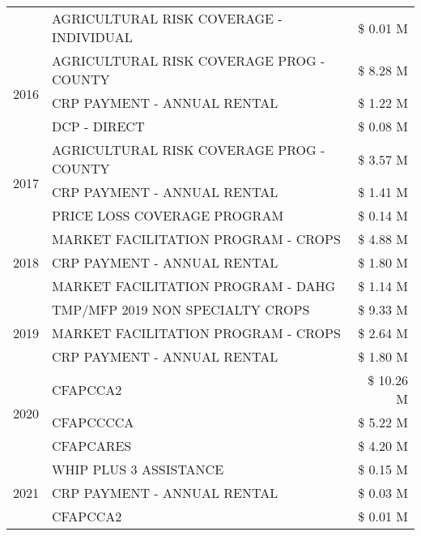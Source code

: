 \begin{tabular}{llr}
 & AGRICULTURAL RISK COVERAGE - INDIVIDUAL & \$ 0.01 M \\
\cline{1-3}
\multirow[t]{3}{*}{2016} & AGRICULTURAL RISK COVERAGE PROG - COUNTY & \$ 8.28 M \\
 & CRP PAYMENT - ANNUAL RENTAL & \$ 1.22 M \\
 & DCP - DIRECT & \$ 0.08 M \\
\cline{1-3}
\multirow[t]{3}{*}{2017} & AGRICULTURAL RISK COVERAGE PROG - COUNTY & \$ 3.57 M \\
 & CRP PAYMENT - ANNUAL RENTAL & \$ 1.41 M \\
 & PRICE LOSS COVERAGE PROGRAM & \$ 0.14 M \\
\cline{1-3}
\multirow[t]{3}{*}{2018} & MARKET FACILITATION PROGRAM - CROPS & \$ 4.88 M \\
 & CRP PAYMENT - ANNUAL RENTAL & \$ 1.80 M \\
 & MARKET FACILITATION PROGRAM - DAHG & \$ 1.14 M \\
\cline{1-3}
\multirow[t]{3}{*}{2019} & TMP/MFP 2019 NON SPECIALTY CROPS & \$ 9.33 M \\
 & MARKET FACILITATION PROGRAM - CROPS & \$ 2.64 M \\
 & CRP PAYMENT - ANNUAL RENTAL & \$ 1.80 M \\
\cline{1-3}
\multirow[t]{3}{*}{2020} & CFAPCCA2 & \$ 10.26 M \\
 & CFAPCCCCA & \$ 5.22 M \\
 & CFAPCARES & \$ 4.20 M \\
\cline{1-3}
\multirow[t]{3}{*}{2021} & WHIP PLUS 3 ASSISTANCE & \$ 0.15 M \\
 & CRP PAYMENT - ANNUAL RENTAL & \$ 0.03 M \\
 & CFAPCCA2 & \$ 0.01 M \\
\cline{1-3}
\bottomrule
\end{tabular}
